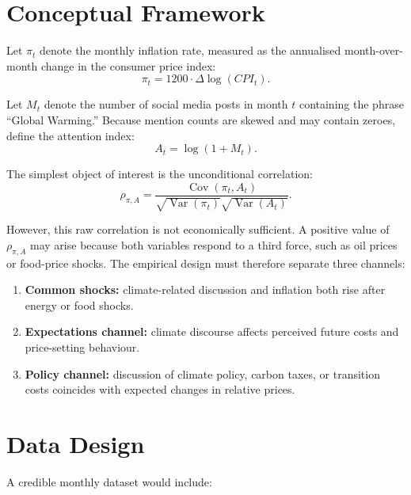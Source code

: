 \documentclass[12pt]{article}
\begin{document}
\section{Conceptual Framework}

Let $\pi_t$ denote the monthly inflation rate, measured as the annualised month-over-month change in the consumer price index:
\begin{equation}
    \pi_t = 1200 \cdot \Delta \log(CPI_t).
\end{equation}

Let $M_t$ denote the number of social media posts in month $t$ containing the phrase ``Global Warming.'' Because mention counts are skewed and may contain zeroes, define the attention index:
\begin{equation}
    A_t = \log(1 + M_t).
\end{equation}

The simplest object of interest is the unconditional correlation:
\begin{equation}
    \rho_{\pi,A} =
    \frac{\operatorname{Cov}(\pi_t, A_t)}
    {\sqrt{\operatorname{Var}(\pi_t)}\sqrt{\operatorname{Var}(A_t)}}.
\end{equation}

However, this raw correlation is not economically sufficient. A positive value of $\rho_{\pi,A}$ may arise because both variables respond to a third force, such as oil prices or food-price shocks. The empirical design must therefore separate three channels:

\begin{enumerate}
    \item \textbf{Common shocks:} climate-related discussion and inflation both rise after energy or food shocks.
    \item \textbf{Expectations channel:} climate discourse affects perceived future costs and price-setting behaviour.
    \item \textbf{Policy channel:} discussion of climate policy, carbon taxes, or transition costs coincides with expected changes in relative prices.
\end{enumerate}

\section{Data Design}

A credible monthly dataset would include:
\end{document}
